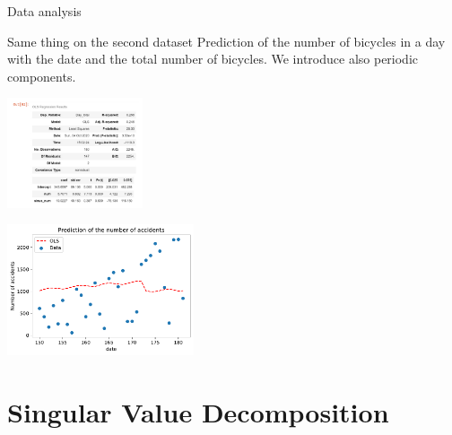 \documentclass[unknownkeysallowed]{beamer}
\begin{document}
\begin{frame}{Data analysis}

\begin{block}{Same thing on the second dataset}
Prediction of the number of bicycles in a day with the date and the total number of bicycles. We introduce also periodic components.
\end{block}


\begin{minipage}[c]{.36\linewidth}
     \begin{center}
             \includegraphics[width=4cm]{stat_model_albert}
         \end{center}
   \end{minipage} \hfill
   \begin{minipage}[c]{.55\linewidth}
    \begin{center}
            \includegraphics[width=5.5cm]{accidentpredictionalbert1}

        \end{center}

 \end{minipage}
\end{frame}



\section{Singular Value Decomposition}
\label{sec:conclusion}
\end{document}
